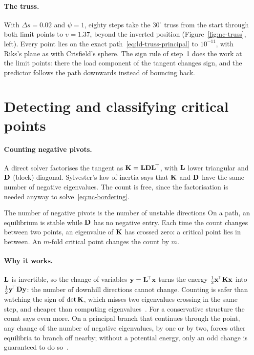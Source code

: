 \paragraph{The truss.}
With $\Delta s = 0.02$ and $\psi = 1$, eighty steps take the $30^\circ$ truss from the start
through both limit points to $v = 1.37$, beyond the inverted position
(Figure~\ref{fig:nc-truss}, left). Every point lies on the exact
path~\eqref{eq:ld-truss-principal} to $10^{-11}$, with Riks's plane as with Crisfield's
sphere. The sign rule of step~1 does the work at the limit points: there the load
component of the tangent changes sign, and the predictor follows the path downwards
instead of bouncing back.

\section{Detecting and classifying critical points}\label{sec:nc-detect}
%

\paragraph{Counting negative pivots.}
A direct solver factorises the tangent as $\mathbf{K} = \mathbf{L}\mathbf{D}\mathbf{L}^{\!\top}$, with
$\mathbf{L}$ lower triangular and $\mathbf{D}$ (block) diagonal. Sylvester's law of inertia
says that $\mathbf{K}$ and $\mathbf{D}$ have the same number of negative eigenvalues. The count
is free, since the factorisation is needed anyway to solve~\eqref{eq:nc-bordering}.

\begin{gbox}{The number of negative pivots is the number of unstable directions}\label{sec:nc-inertia}
%
On a path, an equilibrium is stable while $\mathbf{D}$ has no negative entry. Each time the
count changes between two points, an eigenvalue of $\mathbf{K}$ has crossed zero: a critical
point lies in between. An $m$-fold critical point changes the count by $m$.
\end{gbox}

\paragraph{Why it works.}
$\mathbf{L}$ is invertible, so the change of variables $\mathbf{y} = \mathbf{L}^{\!\top}\mathbf{x}$ turns the
energy $\tfrac12\mathbf{x}^{\!\top}\mathbf{K}\mathbf{x}$ into $\tfrac12\mathbf{y}^{\!\top}\mathbf{D}\mathbf{y}$: the number of
downhill directions cannot change. Counting is safer than watching the sign of
$\det\mathbf{K}$, which misses two eigenvalues crossing in the same step, and cheaper than
computing eigenvalues~\cite[slides~3 and~6]{nc-triantafyllidis2018}. For a conservative structure the count says
even more. On a principal branch that continues through the point, any change of the number of
negative eigenvalues, by one or by two, forces other equilibria to branch off nearby; without a
potential energy, only an odd change is guaranteed to do so~\cite[Sections~II.4 and~II.7]{nc-kielhofer2004}.

